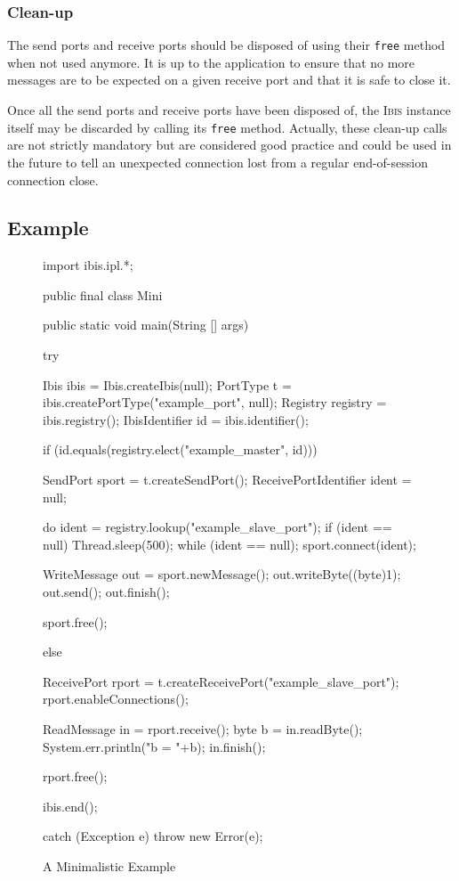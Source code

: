 \documentclass[11pt]{book}
\def\Ibis{\textsc{Ibis}\xspace}
\begin{document}
%
\subsubsection{Clean-up}
\label{sec:clean-up-2}

The send ports and receive ports should be disposed of using their
\texttt{free} method when not used anymore. It is up to the
application to ensure that no more messages are to be expected on a
given receive port and that it is safe to close it.

Once all the send ports and receive ports have been disposed of, the
\Ibis instance itself may be discarded by calling its \texttt{free}
method. Actually, these clean-up calls are not strictly mandatory but
are considered good practice and could be used in the future to tell
an unexpected connection lost from a regular end-of-session connection
close.


\subsection{Example}
\label{sec:example}

\begin{figure}[htbp]
  \centering
\begin{Miniverb}
import ibis.ipl.*;

public final class Mini {
  public static void main(String [] args) {
    try {
      Ibis ibis         = Ibis.createIbis(null);
      PortType t        = ibis.createPortType("example_port", null);
      Registry registry = ibis.registry();
      IbisIdentifier id = ibis.identifier();

      if (id.equals(registry.elect("example_master", id))) {
        SendPort sport = t.createSendPort();
        ReceivePortIdentifier ident = null;

        do {
          ident = registry.lookup("example_slave_port");
          if (ident == null) {
            Thread.sleep(500);
          }
        } while (ident == null);
        sport.connect(ident);

        WriteMessage out = sport.newMessage();
        out.writeByte((byte)1);
        out.send();
        out.finish();

        sport.free();
      } else {
        ReceivePort rport = t.createReceivePort("example_slave_port");
        rport.enableConnections();

        ReadMessage in = rport.receive();
        byte b = in.readByte();
        System.err.println("b = "+b);
        in.finish();

        rport.free();
      }

      ibis.end();
    } catch (Exception e) {
      throw new Error(e);
    }
  }
}
\end{Miniverb}

  \caption{A Minimalistic Example}
  \label{fig:mini-example}
\end{figure}
\end{document}
